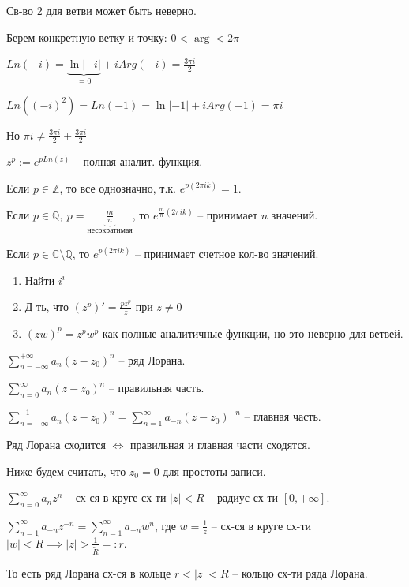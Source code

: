 \begin{remark}
    Св-во 2 для ветви может быть неверно.

    Берем конкретную ветку и точку:
    $0 < \arg < 2 \pi$

    $Ln(-i) = \underbrace{\ln{|-i|}}_{=0} + i Arg(-i) = \frac{3\pi i}{2}$

    $Ln((-i)^2) = Ln(-1) = \ln{|-1|} + i Arg(-1) = \pi i$

    Но $\pi i \not = \frac{3 \pi i}{2} + \frac{3 \pi i}{2}$
\end{remark}

\begin{remark}
    $z^p := e^{p Ln(z)}$ -- полная аналит. функция.

    Если $p \in \mathbb{Z}$, то все однозначно, т.к. $e^{p (2 \pi i k)} = 1$.

    Если $p \in \mathbb{Q}, \ p = \underbrace{\frac{m}{n}}_{\text{несократимая}}$, то $e^{\frac{m}{n} (2 \pi i k)}$ -- принимает $n$ значений.

    Если $p \in \mathbb{C} \setminus \mathbb{Q}$, то $e^{p (2 \pi i k)}$ -- принимает счетное кол-во значений.
\end{remark}



\begin{exerc}
    \begin{enumerate}
        \item Найти $i^i$
        \item Д-ть, что $(z^p)' = \frac{p z^p}{z}$ при $z \not = 0$
        \item $(z w)^p = z^p w^p$ как полные аналитичные функции, но это неверно для ветвей.
    \end{enumerate}
\end{exerc}



\begin{definition}
    $\sum_{n=-\infty}^{+\infty} a_n (z - z_0)^n$ -- ряд Лорана.

    $\sum_{n = 0}^{\infty} a_n (z - z_0)^n$ -- правильная часть.
    
    $\sum_{n = -\infty}^{-1} a_n (z - z_0)^n = \sum_{n = 1}^{\infty} a_{-n} (z - z_0)^{-n}$ -- главная часть.

    Ряд Лорана сходится $\Leftrightarrow$ правильная и главная части сходятся.
    
    Ниже будем считать, что $z_0 = 0$ для простоты записи.

    $\sum_{n=0}^{\infty} a_n z^n$ -- сх-ся в круге сх-ти $|z| < R$ -- радиус сх-ти $[0, +\infty]$.

    $\sum_{n = 1}^{\infty} a_{-n}z^{-n} = \sum_{n=1}^{\infty} a_{-n} w^{n}$, где $w = \frac{1}{z}$ -- сх-ся в круге сх-ти $|w| < \tilde{R} \implies |z| > \frac{1}{\tilde{R}} =: r$.

    То есть ряд Лорана сх-ся в кольце $r < |z| < R$ -- кольцо сх-ти ряда Лорана.
\end{definition}

